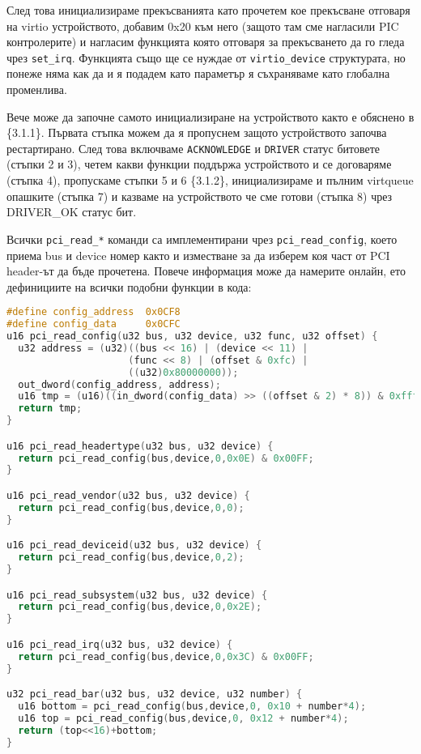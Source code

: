 След това инициализираме прекъсванията като прочетем кое прекъсване отговаря на virtio устройството, добавим 0x20 към него (защото там сме нагласили PIC контролерите) и нагласим функцията която отговаря за прекъсването да го гледа чрез {\tt set\_irq}. Функцията също ще се нуждае от {\tt virtio\_device} структурата, но понеже няма как да и я подадем като параметър я съхраняваме като глобална променлива.

Вече може да започне самото инициализиране на устройството както е обяснено в \{3.1.1\}. Първата стъпка можем да я пропуснем защото устройството започва рестартирано. След това включваме {\tt ACKNOWLEDGE} и {\tt DRIVER} статус битовете (стъпки 2 и 3), четем какви функции поддържа устройството и се договаряме (стъпка 4), пропускаме стъпки 5 и 6 \{3.1.2\}, инициализираме и пълним virtqueue опашките (стъпка 7) и казваме на устройството че сме готови (стъпка 8) чрез DRIVER\_OK статус бит.

Всички {\tt pci\_read\_*} команди са имплементирани чрез {\tt pci\_read\_config}, което приема bus и device номер както и изместване за да изберем коя част от PCI header-ът да бъде прочетена. Повече информация може да намерите онлайн\parencite{pciheader}, ето дефинициите на всички подобни функции в кода:
\begin{lstlisting}[language=C]
#define config_address  0x0CF8
#define config_data     0x0CFC
u16 pci_read_config(u32 bus, u32 device, u32 func, u32 offset) {
  u32 address = (u32)((bus << 16) | (device << 11) |
                     (func << 8) | (offset & 0xfc) |
                     ((u32)0x80000000));
  out_dword(config_address, address);
  u16 tmp = (u16)((in_dword(config_data) >> ((offset & 2) * 8)) & 0xffff);
  return tmp;
}

u16 pci_read_headertype(u32 bus, u32 device) {
  return pci_read_config(bus,device,0,0x0E) & 0x00FF;
}

u16 pci_read_vendor(u32 bus, u32 device) {
  return pci_read_config(bus,device,0,0);
}

u16 pci_read_deviceid(u32 bus, u32 device) {
  return pci_read_config(bus,device,0,2);
}

u16 pci_read_subsystem(u32 bus, u32 device) {
  return pci_read_config(bus,device,0,0x2E);
}

u16 pci_read_irq(u32 bus, u32 device) {
  return pci_read_config(bus,device,0,0x3C) & 0x00FF;
}

u32 pci_read_bar(u32 bus, u32 device, u32 number) {
  u16 bottom = pci_read_config(bus,device,0, 0x10 + number*4);
  u16 top = pci_read_config(bus,device,0, 0x12 + number*4);
  return (top<<16)+bottom;
}
\end{lstlisting}

